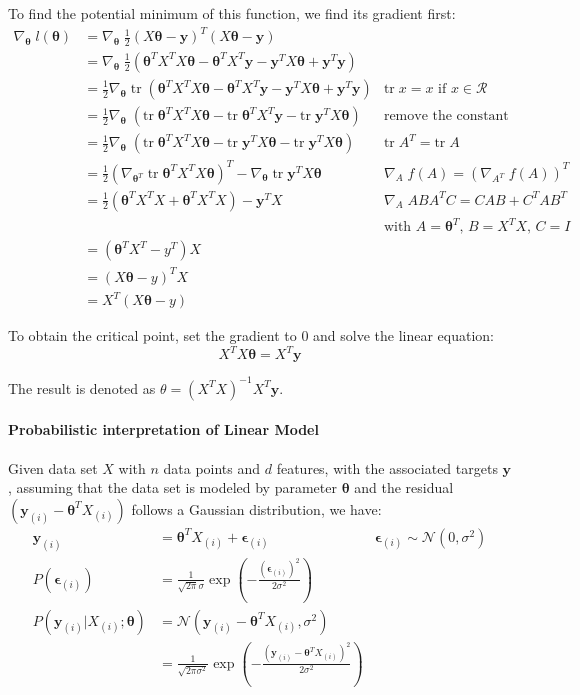 \documentclass{article}
\renewcommand{\pmb}[1]{\boldsymbol{#1}}
\newcommand{\grad}[1]{\nabla_{#1}\;}
\newcommand{\tr}{\text{tr}\;}
\begin{document}
To find the potential minimum of this function, we find its gradient first:
\begin{align*}
    \grad{\pmb\theta} l(\pmb\theta) &= \grad{\pmb\theta} \frac{1}{2} (X\pmb\theta - \pmb y)^T (X\pmb\theta - \pmb y) \\
    &= \grad{\pmb\theta} \frac{1}{2} (\pmb{\theta}^T X^T X \pmb{\theta} - \pmb{\theta}^T X^T \pmb{y} - \pmb{y}^T X \pmb{\theta} + \pmb{y}^T \pmb{y}) \\
    &= \frac{1}{2} \grad{\pmb\theta} \tr (\pmb{\theta}^T X^T X \pmb{\theta} - \pmb{\theta}^T X^T \pmb{y} - \pmb{y}^T X \pmb{\theta} + \pmb{y}^T \pmb{y}) & \text{$\tr x = x$ if $x\in \mathcal{R}$} \\ 
    &= \frac{1}{2} \grad{\pmb\theta} (\tr\pmb{\theta}^T X^T X \pmb{\theta} - \tr\pmb{\theta}^T X^T \pmb{y} - \tr\pmb{y}^T X \pmb{\theta}) & \text{remove the constant} \\
    &= \frac{1}{2} \grad{\pmb\theta} (\tr\pmb{\theta}^T X^T X \pmb{\theta} - \tr\pmb{y}^T X \pmb{\theta} - \tr\pmb{y}^T X \pmb{\theta}) & \tr A^T = \tr A \\
    &= \frac{1}{2} (\grad{\pmb\theta^T} \tr \pmb{\theta}^T X^T X \pmb{\theta})^T - \grad{\pmb{\theta}} \tr\pmb{y}^T X \pmb{\theta} & \grad{A} f(A) = (\grad{A^T} f(A))^T \\ 
    &= \frac{1}{2}(\pmb{\theta}^T X^T X + \pmb{\theta}^T X^T X) - \pmb{y}^T X & \grad{A} A B A^T C = CAB + C^T A B^T \\ 
    & & \text{with $A = \pmb\theta^T$, $B = X^T X$, $C = I$} \\ 
    &= (\pmb{\theta}^T X^T - y^T) X \\ 
    &= (X \pmb\theta - y)^T X \\
    &= X^T (X \pmb\theta - y)
\end{align*}

To obtain the critical point, set the gradient to $0$ and solve the linear equation:
$$X^T X \pmb{\theta} = X^T \pmb{y}$$

The result is denoted as $\theta = (X^T X)^{-1} X^T \pmb{y}$.

\paragraph{Probabilistic interpretation of Linear Model}
Given data set $X$ with $n$ data points and $d$ features, with the associated targets $\pmb{y}$, assuming that the data set is modeled by parameter $\pmb{\theta}$ and the residual $(\pmb{y}_{(i)} - \pmb{\theta}^T X_{(i)})$ follows a Gaussian distribution, we have:
\begin{align*}
    \pmb{y}_{(i)} &= \pmb{\theta}^T X_{(i)} + \pmb\epsilon_{(i)} & \pmb\epsilon_{(i)} \sim \mathcal{N}(0, \sigma^2) \\ 
    P(\pmb\epsilon_{(i)}) &= \frac{1}{\sqrt{2\pi}\sigma} \exp{\left(-\frac{(\pmb\epsilon_{(i)})^2}{2\sigma^2}\right)} \\ 
    P(\pmb{y}_{(i)} | X_{(i)} ; \pmb{\theta}) &= \mathcal{N}(\pmb{y}_{(i)} - \pmb{\theta}^T X_{(i)}, \sigma^2) \\
    &= \frac{1}{\sqrt{2\pi\sigma^2}} \exp{\left(-\frac{(\pmb{y}_{(i)} - \pmb{\theta}^T X_{(i)})^2}{2\sigma^2}\right)} 
\end{align*}
\end{document}
